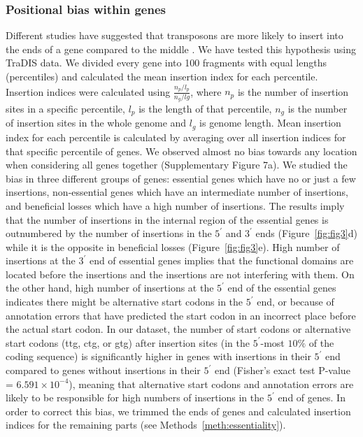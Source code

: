 \documentclass[12pt,letterpaper]{article}
\begin{document}
\subsubsection{Positional bias within genes}
Different studies have suggested that transposons are more likely to insert into the ends of a gene compared to the middle \cite{jacobs_comprehensive_2003, hutchison_global_1999, griffin_high-resolution_2011, gallagher_genome-scale_2011, zomer_essentials:_2012}. We have tested this hypothesis using TraDIS data. We divided every gene into 100 fragments with equal lengths (percentiles) and calculated the mean insertion index for each percentile. Insertion indices were calculated using $\frac{n_p/l_p}{n_g/lg}$, where $n_p$ is the number of insertion sites in a specific percentile, $l_p$ is the length of that percentile, $n_g$ is the number of insertion sites in the whole genome and $l_g$ is genome length. Mean insertion index for each percentile is calculated by averaging over all insertion indices for that specific percentile of genes. We observed almost no bias towards any location when considering all genes together (Supplementary Figure 7a). We studied the bias in three different groups of genes: essential genes which have no or just a few insertions, non-essential genes which have an intermediate number of insertions, and beneficial losses which have a high number of insertions. The results imply that the number of insertions in the internal region of the essential genes is outnumbered by the number of insertions in the $5^\prime$ and $3^\prime$ ends (Figure~\ref{fig:fig3}d) while it is the opposite in beneficial losses (Figure~\ref{fig:fig3}e). High number of insertions at the $3^\prime$ end of essential genes implies that the functional domains are located before the insertions and the insertions are not interfering with them. On the other hand, high number of insertions at the $5^\prime$ end of the essential genes indicates there might be alternative start codons in the $5^\prime$ end, or because of annotation errors that have predicted the start codon in an incorrect place before the actual start codon. In our dataset, the number of start codons or alternative start codons (ttg, ctg, or gtg) after insertion sites (in the $5^\prime$-most $10\%$ of the coding sequence) is significantly higher in genes with insertions in their $5^\prime$ end compared to genes without insertions in their $5^\prime$ end (Fisher's exact test P-value = $6.591 \times 10^{-4}$), meaning that alternative start codons and annotation errors are likely to be responsible for high numbers of insertions in the $5^\prime$ end of genes. In order to correct this bias, we trimmed the ends of genes and calculated insertion indices for the remaining parts (see Methods~\ref{meth:essentiality}). 
\end{document}
